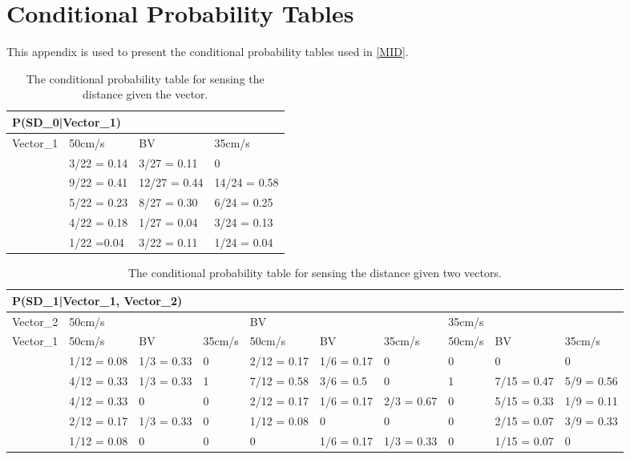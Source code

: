 \chapter{Conditional Probability Tables}\label{AppProbTabs}
This appendix is used to present the conditional probability tables used in \autoref{MID}.
\begin{center}
\begin{table}[H]
\begin{tabular}{|l|l|l|l|}
\hline
\multicolumn{4}{|l|}{P(SD\_0|Vector\_1)} \\ \hline
Vector\_1     & 50cm/s & BV & 35cm/s \\\hline
[0 - 60]      & 3/22 = 0.14 & 3/27 = 0.11 & 0 \\ \hline
[60 - 75]    & 9/22 = 0.41 & 12/27 = 0.44 & 14/24 = 0.58 \\ \hline
[75 - 90]   & 5/22 = 0.23 & 8/27 = 0.30 & 6/24 = 0.25 \\ \hline
[90 - 105]   & 4/22 = 0.18 & 1/27 = 0.04 & 3/24 = 0.13 \\ \hline
[105 - 255]   & 1/22 =0.04 & 3/22 = 0.11 & 1/24 = 0.04   \\ \hline
\end{tabular}
\caption{The conditional probability table for sensing the distance given the
vector.}
\label{SDtable}
\end{table}
\end{center}


\begin{table}[H]
\centering
\begin{tabular}{|l|p{1.2cm}|p{1.2cm}|l|p{1.2cm}|p{1.2cm}|p{1.2cm}|l|p{1.2cm}|p{1.2cm}|}
\hline
\multicolumn{10}{|l|}{P(SD\_1|Vector\_1, Vector\_2)} \\\hline
Vector\_2 & \multicolumn{3}{l|}{50cm/s} & \multicolumn{3}{l|}{BV} &
\multicolumn{3}{l|}{35cm/s}\\\hline
Vector\_1 & 50cm/s      &  BV     & 35cm/s      & 50cm/s      & BV      & 35cm/s
& 50cm/s & BV & 35cm/s \\\hline
[0-60]&1/12 = 0.08 & 1/3 = 0.33 & 0      & 2/12 = 0.17 & 1/6 = 0.17 & 0 & 0
& 0 & 0 \\ \hline
[60-75]&4/12 = 0.33 & 1/3 = 0.33 & 1      & 7/12 = 0.58 & 3/6 = 0.5 & 0      & 1
& 7/15 = 0.47 & 5/9 = 0.56\\ \hline
[75-90] & 4/12 = 0.33 & 0 & 0 & 2/12 = 0.17 & 1/6 = 0.17 & 2/3 = 0.67 & 0
& 5/15 = 0.33 &1/9 = 0.11\\\hline
[90-105] & 2/12 = 0.17 & 1/3 = 0.33 & 0 & 1/12 = 0.08 & 0 & 0 & 0
& 2/15 = 0.07  & 3/9 = 0.33\\\hline
[105-255] & 1/12 = 0.08 & 0 & 0 & 0 & 1/6 = 0.17 & 1/3 = 0.33 & 0 & 1/15 = 0.07
&0\\\hline
\end{tabular}
\caption{The conditional probability table for sensing the distance given two
vectors.}
\label{SDtable2}
\end{table}

